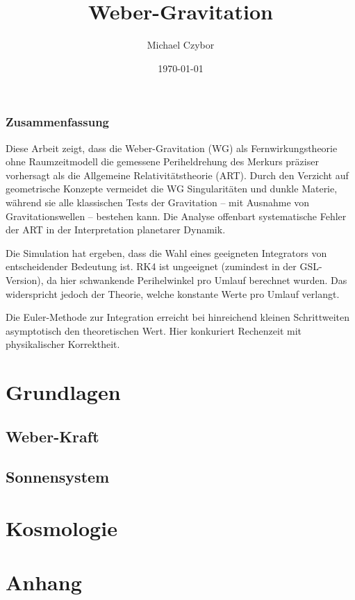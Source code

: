 \documentclass{book}
\numberwithin{equation}{section}
\begin{document}
\title{Weber-Gravitation}
\author{Michael Czybor}
\date{\today}
\maketitle

\section*{Zusammenfassung}
Diese Arbeit zeigt, dass die Weber-Gravitation (WG) als Fernwirkungstheorie ohne Raumzeitmodell die gemessene Periheldrehung des Merkurs präziser
vorhersagt als die Allgemeine Relativitätstheorie (ART). Durch den Verzicht auf geometrische Konzepte vermeidet die WG Singularitäten und dunkle Materie,
während sie alle klassischen Tests der Gravitation – mit Ausnahme von Gravitationswellen – bestehen kann. Die Analyse offenbart systematische Fehler der ART
in der Interpretation planetarer Dynamik.

Die Simulation hat ergeben, dass die Wahl eines geeigneten Integrators von entscheidender Bedeutung ist. RK4 ist ungeeignet (zumindest in der GSL-Version),
da hier schwankende Perihelwinkel pro Umlauf berechnet wurden. Das widerspricht jedoch der Theorie, welche konstante Werte pro Umlauf verlangt.

Die Euler-Methode zur Integration erreicht bei hinreichend kleinen Schrittweiten asymptotisch den theoretischen Wert. Hier konkuriert Rechenzeit
mit physikalischer Korrektheit.

\tableofcontents

\part{Grundlagen}
\chapter{Weber-Kraft}





\chapter{Sonnensystem}


\part{Kosmologie}

\part{Anhang}


\end{document}
